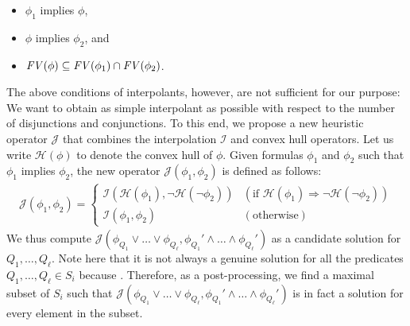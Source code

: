 \begin{itemize}
\item \(\phi_1\) implies \(\phi\),
\item \(\phi\) implies \(\phi_2\), and
\item \(\mathit{FV}({\phi}) \subseteq \mathit{FV}({\phi_1}) \cap \mathit{FV}({\phi_2})\).
\end{itemize}
The above conditions of interpolants, however, are not sufficient for 
our purpose: We want to obtain as simple interpolant as possible with 
respect to the number of disjunctions and conjunctions.  To this end, we 
propose a new heuristic operator \(\mathcal{J}\) that combines the 
interpolation \(\mathcal{I}\) and convex hull operators.  Let us write 
\(\mathcal{H}(\phi)\) to denote the convex hull of \(\phi\).  Given 
formulas \(\phi_1\) and \(\phi_2\) such that \(\phi_1\) implies 
\(\phi_2\), the new operator \(\mathcal{J}(\phi_1,\phi_2)\) is defined 
as follows:
\begin{eqnarray*}
\mathcal{J}(\phi_1,\phi_2) =
\left\{
\begin{array}{ll}
\mathcal{I}(\mathcal{H}(\phi_1),\neg \mathcal{H}(\neg \phi_2)) & (\mbox{if~}\mathcal{H}(\phi_1) \Rightarrow \neg \mathcal{H}(\neg \phi_2)) \\
\mathcal{I}(\phi_1,\phi_2) & (\mbox{otherwise})
\end{array}
\right.
\end{eqnarray*}
  We thus compute 
\(\mathcal{J}(\phi_{Q_1} \lor \dots \lor \phi_{Q_{\ell}},\phi_{Q_1}' 
\land \dots \land \phi_{Q_{\ell}}')\) as a candidate solution for 
\(Q_1,\dots,Q_{\ell}\).  Note here that it is not always a genuine 
solution for all the predicates \(Q_1,\dots,Q_{\ell} \in S_i\) because 
\todo{}.  Therefore, as a post-processing, we find a maximal subset of 
\(S_i\) such that \(\mathcal{J}(\phi_{Q_1} \lor \dots \lor 
\phi_{Q_{\ell}},\phi_{Q_1}' \land \dots \land \phi_{Q_{\ell}}')\) is in 
fact a solution for every element in the subset.



%
